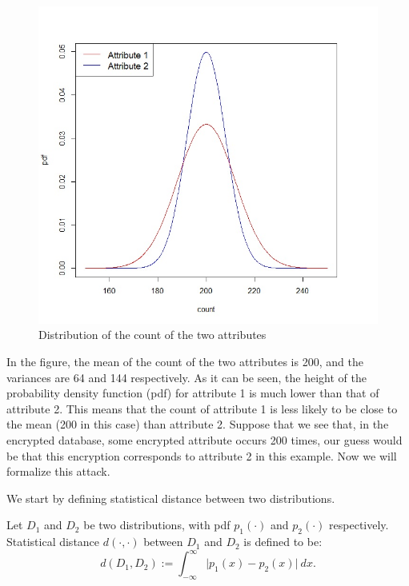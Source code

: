 \begin{figure}[H]
	\centering
	\includegraphics[scale=0.5]{./Images/Distributions.jpg}
	\caption{Distribution of the count of the two attributes} \label{distribution plot}
\end{figure}

In the figure, the mean of the count of the two attributes is 200, and the variances are 64 and 144 respectively. As it can be seen, the height of the probability density function (pdf) for attribute 1 is much lower than that of attribute 2. This means that the count of attribute 1 is less likely to be close to the mean (200 in this case) than attribute 2. Suppose that we see that, in the encrypted database, some encrypted attribute occurs 200 times, our guess would be that this encryption corresponds to attribute 2 in this example. Now we will formalize this attack.

We start by defining statistical distance between two distributions.
\begin{definition} \label{statistical distance}
	Let $D_1$ and $D_2$ be two distributions, with pdf $p_1(\cdot)$ and $p_2(\cdot)$ respectively. Statistical distance $d(\cdot,\cdot)$ between $D_1$ and $D_2$ is defined to be:
	\begin{equation}
		d(D_1, D_2) := \int_{-\infty}^{\infty} \lvert p_1(x) - p_2(x) \rvert \  dx.
	\end{equation}
\end{definition}

